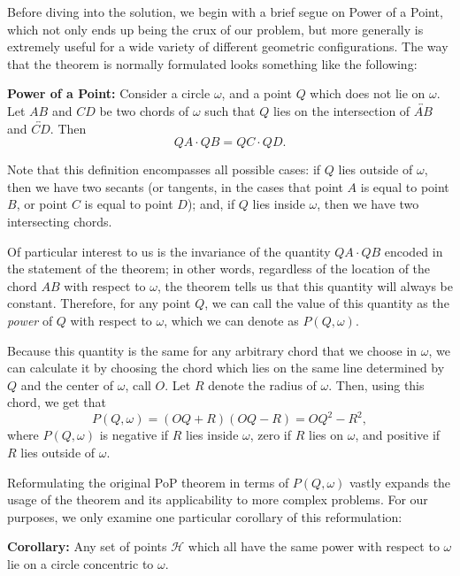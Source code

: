 \documentclass{article}
\newcommand{\V}{

\vspace{\baselineskip}

}
\begin{document}
Before diving into the solution, we begin with a brief segue on Power of a Point, which not only ends up being the crux of our problem, but more generally is extremely useful for a wide variety of different geometric configurations. The way that the theorem is normally formulated looks something like the following: \V

\begin{theorem}
\textbf{Power of a Point:} Consider a circle $\omega$, and a point $Q$ which does not lie on $\omega$. Let $AB$ and $CD$ be two chords of $\omega$ such that $Q$ lies on the intersection of $\overleftrightarrow{AB}$ and $\overleftrightarrow{CD}$. Then 
\[QA\cdot QB = QC\cdot QD.\]
\end{theorem}\V

Note that this definition encompasses all possible cases: if $Q$ lies outside of $\omega$, then we have two secants (or tangents, in the cases that point $A$ is equal to point $B$, or point $C$ is equal to point $D$); and, if $Q$ lies inside $\omega$, then we have two intersecting chords.\V

Of particular interest to us is the invariance of the quantity $QA\cdot QB$ encoded in the statement of the theorem; in other words, regardless of the location of the chord $AB$ with respect to $\omega$, the theorem tells us that this quantity will always be constant. Therefore, for any point $Q$, we can call the value of this quantity as the \textit{power} of $Q$ with respect to $\omega$, which we can denote as $P(Q, \omega)$. \V

Because this quantity is the same for any arbitrary chord that we choose in $\omega$, we can calculate it by choosing the chord which lies on the same line determined by $Q$ and the center of $\omega$, call $O$. Let $R$ denote the radius of $\omega$. Then, using this chord, we get that 
\[P(Q, \omega) = (OQ+R)(OQ-R) = OQ^2-R^2,\]
where $P(Q,\omega)$ is negative if $R$ lies inside $\omega$, zero if $R$ lies on $\omega$, and positive if $R$ lies outside of $\omega$. \V

Reformulating the original PoP theorem in terms of $P(Q, \omega)$ vastly expands the usage of the theorem and its applicability to more complex problems. For our purposes, we only examine one particular corollary of this reformulation: \V

\begin{theorem}
\textbf{Corollary:} Any set of points $\mathcal{H}$ which all have the same power with respect to $\omega$ lie on a circle concentric to $\omega$. 
\end{theorem}\V
\end{document}

